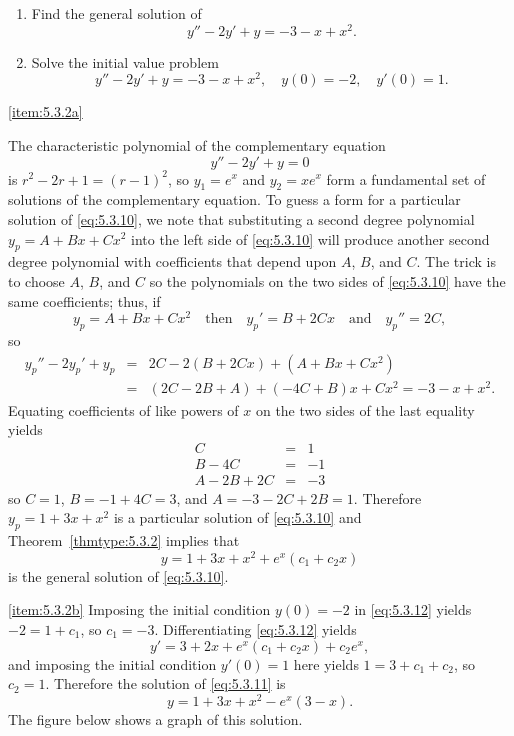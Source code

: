 \documentclass{ximera}
\begin{document}
\begin{example}\label{example:5.3.2} 
\begin{enumerate}
\item \label{item:5.3.2a} %
Find the general solution of
\begin{equation} \label{eq:5.3.10}
y''-2y'+y=-3-x+x^2.
\end{equation}
\item \label{item:5.3.2b} %
Solve the initial value problem
\begin{equation} \label{eq:5.3.11}
y''-2y'+y=-3-x+x^2, \quad  y(0)=-2,\quad y'(0)=1.
\end{equation}
\end{enumerate}

\begin{explanation}
\ref{item:5.3.2a}

The characteristic polynomial of the complementary equation
$$
y''-2y'+y=0
$$
is $r^2-2r+1=(r-1)^2$,
so $y_1=e^x$ and $y_2=xe^x$  form a fundamental set of solutions
of the complementary equation. To guess  a form for a particular
solution of \eqref{eq:5.3.10}, we note that substituting a second
degree polynomial $y_p=A+Bx+Cx^2$ into the left side of \eqref{eq:5.3.10}
will produce another second degree polynomial with coefficients that
depend upon $A$, $B$, and $C$. The trick is to choose $A$, $B$, and
$C$ so the polynomials on the two sides of \eqref{eq:5.3.10} have the
same coefficients;   thus,
if
$$
y_p=A+Bx+Cx^2\quad\mbox{then}\quad
y_p'=B+2Cx\quad\mbox{and}\quad y_p''=2C,
$$
so
\begin{eqnarray*}
y_p''-2y_p'+y_p&=&2C-2(B+2Cx)+(A+Bx+Cx^2)\\
&=&(2C-2B+A)+(-4C+B)x+Cx^2=-3-x+x^2.
\end{eqnarray*}
Equating  coefficients of like powers of $x$ on the two sides of the
last equality yields
\begin{eqnarray*}
C&=&1\\
B-4C&=&-1\\
A-2B+2C&=& -3
\end{eqnarray*}
so $C=1$, $B=-1+4C=3$, and $A=-3-2C+2B=1$.
Therefore $y_p=1+3x+x^2$ is a particular solution of
\eqref{eq:5.3.10} and  Theorem~\ref{thmtype:5.3.2} implies that
\begin{equation} \label{eq:5.3.12}
y=1+3x+x^2+e^x(c_1+c_2x)
\end{equation}
is the general solution of \eqref{eq:5.3.10}.

\ref{item:5.3.2b} Imposing the initial condition $y(0)=-2$ in
\eqref{eq:5.3.12} yields $-2=1+c_1$, so $c_1=-3$. Differentiating
\eqref{eq:5.3.12} yields
$$
y'=3+2x+e^x(c_1+c_2x)+c_2e^x,
$$
and imposing the initial condition $y'(0)=1$ here yields
$1=3+c_1+c_2$, so $c_2=1$. Therefore the solution of \eqref{eq:5.3.11}
is
$$
y=1+3x+x^2-e^x(3-x).
$$
The figure below shows a graph of this solution.


\end{explanation}
\end{example}
\end{document}
